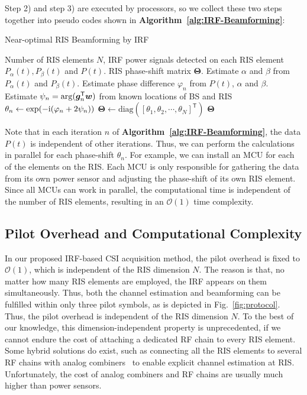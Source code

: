 \documentclass[journal,twocolumn]{IEEEtran}
\theoremstyle{nonumberplain}
\def \T {\bm \Theta}
\def \diag {\text{diag}}
\def \exp {\text{exp}}
\def \T {^{\mathsf{T}}}
\def \ri {{\rm i}}
\begin{document}
    Step 2) and step 3) are executed by processors, so we collect these two steps together into pseudo codes shown in {\bf Algorithm~\ref{alg:IRF-Beamforming}}:
    \begin{algorithm}[t] 
        \caption{Near-optimal RIS Beamforming by IRF} \label{alg:IRF-Beamforming}
        \begin{algorithmic}[1]
            \REQUIRE Number of RIS elements $N$, IRF power signals detected on each RIS element $P_{\alpha}(t), P_{\beta}(t)$ and $P(t)$.
            \ENSURE RIS phase-shift matrix ${\bm \Theta}$.
                \STATE Estimate $\alpha$ and $\beta$ from $P_{\alpha}(t)$ and $P_{\beta}(t)$.
                \STATE Estimate phase difference $\varphi_n$ from $P(t)$, $\alpha$ and $\beta$. 
                \STATE Estimate $\psi_{n} = {\rm arg}(\bm g_{n}\T\bm w)$ from known locations of BS and RIS
                \STATE $\theta_n \leftarrow \exp(-\ri(\varphi_n + 2\psi_n))$
            \ENDFOR
            \STATE ${\bm \Theta} \leftarrow \diag\left(\left[\theta_1, \theta_2, \cdots, \theta_N\right]\T\right)$
            \RETURN ${\bm \Theta}$
        \end{algorithmic}
    \end{algorithm}
    Note that in each iteration $n$ of {\bf Algorithm~\ref{alg:IRF-Beamforming}}, the data $P(t)$ is independent of other iterations. Thus, we can perform the calculations in parallel for each phase-shift $\theta_n$. For example, we can install an MCU for each of the elements on the RIS. Each MCU is only responsible for gathering the data from its own power sensor and adjusting the phase-shift of its own RIS element. Since all MCUs can work in parallel, the computational time is independent of the number of RIS elements, resulting in an $\mathcal{O}(1)$ time complexity. 


\subsection{Pilot Overhead and Computational Complexity}\label{Pilot Overhead}
    In our proposed IRF-based CSI acquisition method, the pilot overhead is fixed to $\mathcal{O}(1)$, which is independent of the RIS dimension $N$. 
    The reason is that, no matter how many RIS elements are employed, the IRF appears on them simultaneously. 
    Thus, both the channel estimation and beamforming can be fulfilled within only three pilot symbols, as is depicted in Fig.~\ref{fig:protocol}. 
    Thus, the pilot overhead is independent of the RIS dimension $N$. 
    To the best of our knowledge, this dimension-independent property is unprecedented, if we cannot endure the cost of attaching a dedicated RF chain to every RIS element. Some hybrid solutions do exist, such as connecting all the RIS elements to several RF chains with analog combiners~\cite{alexandropoulos2021hybrid,alexandropoulos2020hardware} to enable explicit channel estimation at RIS. Unfortunately, the cost of analog combiners and RF chains are usually much higher than power sensors.
    
\end{document}
